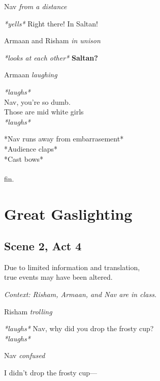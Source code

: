 \documentclass[12pt]{article}
\begin{document}
Nav
\textit{  from a distance}
\begin{center}
    \textit{*yells*} Right there! In Saltan!
\end{center}

Armaan and Risham
\textit{  in unison}
\begin{center}
    \textit{*looks at each other* } 
    \textbf{Saltan?}
\end{center}

Armaan
\textit{  laughing}
\begin{center}
    \textit{*laughs*\\} 
    Nav, you're so dumb.\\Those are mid white girls\\
    \textit{*laughs*} 
\end{center}

\smallskip
\begin{center}
    *Nav runs away from embarrasement*\\*Audience claps*\\*Cast bows*\\~\\fin.
\end{center}

\newpage
\section*{Great Gaslighting}
\subsection*{Scene 2, Act 4}
\smallskip
\begin{center}
    \tiny{Due to limited information and translation,\\true events may have been altered.}
\end{center}

\begin{center}
    \textit{Context: Risham, Armaan, and Nav are in class.}
\end{center}

Risham
\textit{  trolling}
\begin{center}
    \textit{*laughs*} 
    Nav, why did you drop the frosty cup?\\
    \textit{*laughs*}
\end{center}

Nav
\textit{  confused}
\begin{center}
    I didn't drop the frosty cup---
\end{center}
\end{document}
